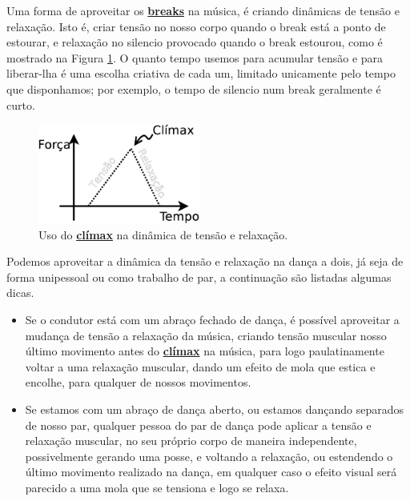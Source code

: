 
Uma forma de aproveitar os \hyperref[sec:UsandoBreak]{\textbf{breaks}} na música,
é criando dinâmicas de tensão e relaxação.
Isto é, criar tensão  no nosso corpo quando o break está a ponto de estourar,
e relaxação no silencio provocado quando o break estourou,
como é mostrado na Figura \ref{fig:tension-release-climax}.
O quanto tempo usemos para acumular tensão e para liberar-lha 
é uma escolha criativa de cada um, 
limitado unicamente pelo tempo que disponhamos;
por exemplo, o tempo de silencio num break geralmente é curto.



\begin{figure}[!h]
  \centering
    \includegraphics[width=0.475\textwidth]{chapters/cap-musicalidade/tension-release-climax.eps}
\caption{Uso do \hyperref[ref:climax]{\textbf{clímax}} na dinâmica de tensão e relaxação.}
\label{fig:tension-release-climax}
\end{figure}



Podemos aproveitar a dinâmica da tensão e relaxação na dança a dois,
já seja de forma unipessoal ou como trabalho de par,
a continuação são listadas algumas dicas.
\begin{itemize}
\item Se o condutor está com um abraço fechado de dança, 
é possível aproveitar a mudança de tensão a relaxação da música,
criando tensão muscular nosso último movimento antes do \hyperref[ref:climax]{\textbf{clímax}} na música,
para logo paulatinamente voltar a uma relaxação muscular,
dando um efeito de mola que estica e encolhe,
para qualquer de nossos movimentos.
\item Se estamos com um abraço de dança aberto, ou estamos dançando separados de nosso par,
qualquer pessoa do par de dança pode aplicar a tensão e relaxação muscular, 
no seu próprio corpo de maneira independente, possivelmente gerando uma posse,
e voltando a relaxação, ou estendendo o último movimento realizado na dança,
em qualquer caso o efeito visual será parecido a uma mola que se tensiona e logo se relaxa.
\end{itemize}



